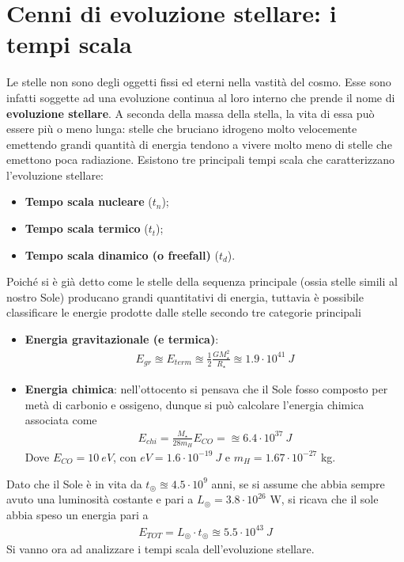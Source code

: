 \documentclass[a4paper, oneside]{book}
\begin{document}
\section{Cenni di evoluzione stellare: i tempi scala}
Le stelle non sono degli oggetti fissi ed eterni nella vastità del cosmo. Esse sono infatti soggette ad una evoluzione continua 
al loro interno che prende il nome di \textbf{evoluzione stellare}. A seconda della massa della stella, la vita di essa può essere più 
o meno lunga: stelle che bruciano idrogeno molto velocemente emettendo grandi quantità di energia tendono a vivere molto meno 
di stelle che emettono poca radiazione. Esistono tre principali tempi scala che caratterizzano l'evoluzione stellare: 
\begin{itemize}
    \item \textbf{Tempo scala nucleare} ($t_n$);
    \item \textbf{Tempo scala termico} ($t_t$);
    \item \textbf{Tempo scala dinamico (o freefall)} ($t_d$).
\end{itemize}
Poiché si è già detto come le stelle della sequenza principale (ossia stelle simili al 
nostro Sole) producano grandi quantitativi di energia, tuttavia è possibile classificare le 
energie prodotte dalle stelle secondo tre categorie principali
\begin{itemize}
    \item \textbf{Energia gravitazionale (e termica)}: 
    \begin{gather*}
        E_{gr} \approxeq E_{term} \approxeq \frac{1}{2}\frac{GM_\star^{2}}{R_\star} \approxeq 1.9 \cdot 10^{41} \ J
    \end{gather*}
    \item \textbf{Energia chimica}: nell'ottocento si pensava che il Sole fosso composto per metà
    di carbonio e ossigeno, dunque si può calcolare l'energia chimica associata come 
    \begin{gather*}
        E_{chi} = \frac{M_\star}{28m_H} E_{CO} = \approxeq 6.4 \cdot 10^{37} \ J
    \end{gather*}
    Dove $E_{CO} = 10 \ eV$, con $eV = 1.6 \cdot 10^{-19} \ J$ e $m_H = 1.67 \cdot 10^{-27}$ kg.
\end{itemize}
Dato che il Sole è in vita da $t_\circledcirc \approxeq 4.5 \cdot 10^{9}$ anni, se si assume che abbia sempre 
avuto una luminosità costante e pari a  $L_\circledcirc = 3.8 \cdot 10^{26}$ W, si ricava che 
il sole abbia speso un energia pari a 
\begin{gather*}
    E_{TOT} = L_\circledcirc \cdot t_\circledcirc \approxeq 5.5 \cdot 10^{43} \ J
\end{gather*}
Si vanno ora ad analizzare i tempi scala dell'evoluzione stellare. \\ \noindent
\end{document}
